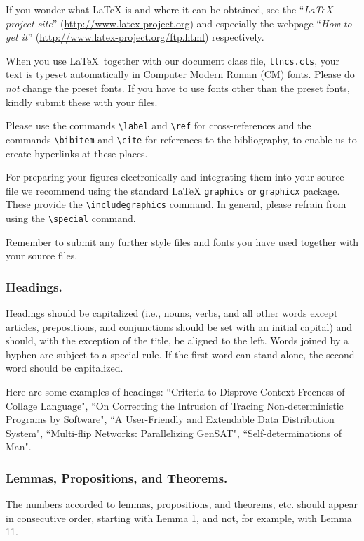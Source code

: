 \documentclass[runningheads,a4paper]{llncs}
\begin{document}
{If you wonder what \LaTeX{} is and where it can be obtained, see the
``\textit{LaTeX project site}'' (\url{http://www.latex-project.org})
and especially the webpage ``\textit{How to get it}''
(\url{http://www.latex-project.org/ftp.html}) respectively.

When you use \LaTeX\ together with our document class file,
\texttt{llncs.cls},
your text is typeset automatically in Computer Modern Roman (CM) fonts.
Please do
\emph{not} change the preset fonts. If you have to use fonts other
than the preset fonts, kindly submit these with your files.

Please use the commands \verb+\label+ and \verb+\ref+ for
cross-references and the commands \verb+\bibitem+ and \verb+\cite+ for
references to the bibliography, to enable us to create hyperlinks at
these places.

For preparing your figures electronically and integrating them into
your source file we recommend using the standard \LaTeX{} \verb+graphics+ or
\verb+graphicx+ package. These provide the \verb+\includegraphics+ command.
In general, please refrain from using the \verb+\special+ command.

Remember to submit any further style files and
fonts you have used together with your source files.

\subsubsection{Headings.}

Headings should be capitalized
(i.e., nouns, verbs, and all other words
except articles, prepositions, and conjunctions should be set with an
initial capital) and should,
with the exception of the title, be aligned to the left.
Words joined by a hyphen are subject to a special rule. If the first
word can stand alone, the second word should be capitalized.

Here are some examples of headings: ``Criteria to Disprove
Context-Freeness of Collage Language", ``On Correcting the Intrusion of
Tracing Non-deterministic Programs by Software", ``A User-Friendly and
Extendable Data Distribution System", ``Multi-flip Networks:
Parallelizing GenSAT", ``Self-determinations of Man".

\subsubsection{Lemmas, Propositions, and Theorems.}

The numbers accorded to lemmas, propositions, and theorems, etc. should
appear in consecutive order, starting with Lemma 1, and not, for
example, with Lemma 11.

}
\end{document}
